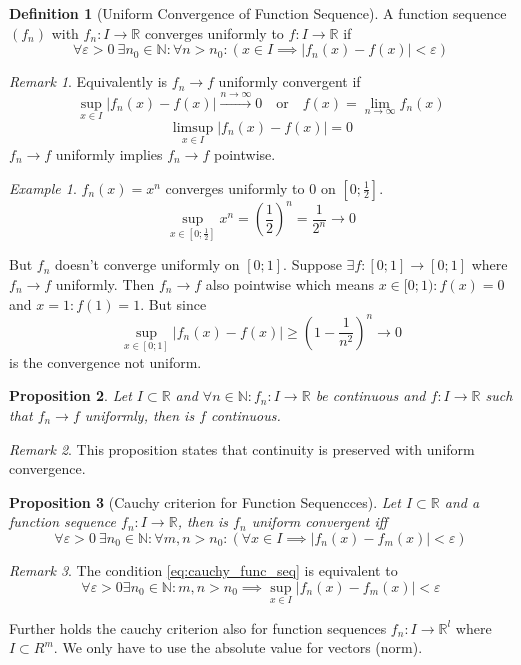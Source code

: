 \documentclass[english,titlepage]{uzhpub}
\theoremstyle{definition}
\newtheorem{definition}{Definition}[section]
\theoremstyle{plain}
\newtheorem{proposition}[definition]{Proposition}
\theoremstyle{remark}
\newtheorem*{remark}{Remark}
\theoremstyle{example}
\newtheorem*{example}{Example}
\begin{document}
   \begin{definition}[Uniform Convergence of Function Sequence]
      A function sequence \((f_n)\) with \(f_n: I \to \mathbb{R}\) converges uniformly to \(f: I \to \mathbb{R}\) if
      \[\forall \varepsilon > 0~\exists n_0 \in \mathbb{N}: \forall n > n_0: (x \in I \implies |f_n(x) - f(x)| < \varepsilon)\]
   \end{definition}
   \begin{remark}
      Equivalently is \(f_n \to f\) uniformly convergent if
      \[\sup_{x \in I} |f_n(x) - f(x)| \xrightarrow{n \to \infty} 0 \quad\text{or}\quad f(x) = \lim_{n \to \infty} f_n(x)\]
      \[\limsup_{x \in I} |f_n(x) - f(x)| = 0\]
      \(f_n \to f\) uniformly implies \(f_n \to f\) pointwise.
   \end{remark}
   \begin{example}
      \(f_n(x) = x^n\) converges uniformly to \(0\) on \([0;\frac{1}{2}]\).
      \[\sup_{x \in [0; \frac{1}{2}]} x^n = \left(\frac{1}{2}\right)^n = \frac{1}{2^n} \to 0\]

      But \(f_n\) doesn't converge uniformly on \([0; 1]\).
      Suppose \(\exists f: [0;1] \to [0;1]\) where \(f_n \to f\) uniformly.
      Then \(f_n \to f\) also pointwise which means \(x \in [0;1): f(x) = 0\) and \(x = 1: f(1) = 1\).
      But since
      \[\sup_{x \in [0;1]} |f_n(x) - f(x)| \geq \left(1 - \frac{1}{n^2}\right)^n \to 0\]
      is the convergence not uniform.
   \end{example}

   \begin{proposition}\label{pro:cont_func}
      Let \(I \subset \mathbb{R}\) and \(\forall n \in \mathbb{N}: f_n: I \to \mathbb{R}\) be continuous and \(f: I \to \mathbb{R}\) such that \(f_n \to f\) uniformly, then is \(f\) continuous.
   \end{proposition}
   \begin{remark}
      This proposition states that continuity is preserved with uniform convergence.
   \end{remark}

   \begin{proposition}[Cauchy criterion for Function Sequencces]\label{pro:cauchy_func_seq}
      Let \(I \subset \mathbb{R}\) and a function sequence \(f_n: I \to \mathbb{R}\), then is \(f_n\) uniform convergent iff
      \begin{equation}\label{eq:cauchy_func_seq}
         \forall \varepsilon > 0~\exists n_0 \in \mathbb{N}: \forall m,n > n_0: (\forall x \in I \implies |f_n(x) - f_m(x)| < \varepsilon)
      \end{equation}
   \end{proposition}
   \begin{remark}
      The condition \cref{eq:cauchy_func_seq} is equivalent to
      \[\forall \varepsilon > 0 \exists n_0 \in \mathbb{N}: m,n > n_0 \implies \sup_{x \in I}|f_n(x) - f_m(x)| < \varepsilon\]

      Further holds the cauchy criterion also for function sequences \(f_n: I \to \mathbb{R}^l\) where \(I \subset R^m\).
      We only have to use the absolute value for vectors (norm).
   \end{remark}
\end{document}
